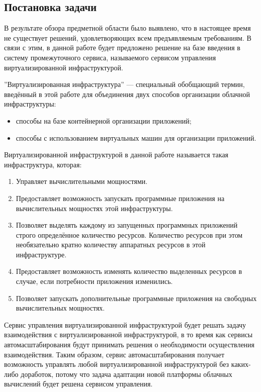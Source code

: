 \subsection{Постановка задачи}
\label{formulation}
В результате обзора предметной области было выявлено, что в настоящее время не существует решений, удовлетворяющих всем предъявляемым требованиям.
В связи с этим, в данной работе будет предложено решение на базе введения в систему промежуточного сервиса, называемого сервисом управления виртуализированной инфраструктурой.

''Виртуализированная инфраструктура'' --- специальный обобщающий термин, введённый в этой работе для объединения двух способов организации облачной инфраструктуры:
\begin{itemize}
    \item способы на базе контейнерной организации приложений;
    \item способы с использованием виртуальных машин для организации приложений.
\end{itemize}
Виртуализированной инфраструктурой в данной работе называется такая инфраструктура, которая:
\begin{enumerate}
    \item Управляет вычислительными мощностями.
    \item Предоставляет возможность запускать программные приложения на вычислительных мощностях этой инфраструктуры.
    \item Позволяет выделять каждому из запущенных программных приложений строго определённое количество ресурсов. 
    Количество ресурсов при этом необязательно кратно количеству аппаратных ресурсов в этой инфраструктуре.
    \item Предоставляет возможность изменять количество выделенных ресурсов в случае, если потребности приложения изменились.
    \item Позволяет запускать дополнительные программные приложения на свободных вычислительных мощностях.
\end{enumerate}

Сервис управления виртуализированной инфраструктурой будет решать задачу взаимодействия с виртуализированной инфраструктурой, в то время как сервисы автомасштабирования будут принимать решения о необходимости осуществления взаимодействия.
Таким образом, сервис автомасштабирования получает возможность управлять любой виртуализированной инфраструктурой без каких-либо доработок, потому что задача адаптации новой платформы облачных вычислений будет решена сервисом управления.

